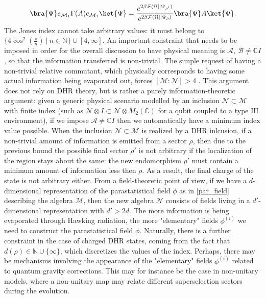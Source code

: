 \documentclass[a4paper,11pt]{article}
\begin{document}
\begin{equation}
    \bra{\Psi} e_{\mathcal{M}_1} \Gamma (A) e_{\mathcal{M}_1} \ket{\Psi} = \frac{e^{2 \beta \mathcal{F}(\Omega||\Psi_{\rho'}) }}{e^{2 \beta \mathcal{F}(\Omega||\Psi_{\rho})}} \bra{\Psi} A \ket{\Psi} \text{.}
\end{equation}
%
The Jones index cannot take arbitrary values: it must belong to $\{ 4 \cos^2(\frac{\pi}{n}) \ | \ n \in \mathbb{N} \} \cup [4, \infty]$. An important constraint that needs to be imposed in order for the overall discussion to have physical meaning is $\mathcal{A}, \ \mathcal{B} \neq \mathbb{C} I$, so that the information transferred is non-trivial. The simple request of having a non-trivial relative commutant, which physically corresponds to having some actual information being evaporated out, forces $[\mathcal{M} : \mathcal{N}] > 4$ \cite{Jones} \cite{Kosaki}. This argument does not rely on DHR theory, but is rather a purely information-theoretic argument: given a generic physical scenario modelled by an inclusion $\mathcal{N} \subset \mathcal{M}$ with finite index (such as $\mathcal{N} \otimes I \subset \mathcal{N} \otimes M_2(\mathbb{C})$ for a qubit coupled to a type $\mathrm{III}$ environment), if we impose $\mathcal{A} \neq \mathbb{C} I$ then we automatically have a minimum index value possible. When the inclusion $\mathcal{N} \subset \mathcal{M}$ is realized by a DHR inlcusion, if a non-trivial amount of information is emitted from a sector $\rho$, then due to the previous bound the possible final sector $\rho'$ is not arbitrary if the localization of the region stays about the same: the new endomorphism $\rho'$ must contain a minimum amount of information less then $\rho$. As a result, the final charge of the state is not arbitrary either.
From a field-theoretic point of view, if we have a $d$-dimensional representation of the parastatistical field $\phi$ as in \ref{par_field} describing the algebra $\mathcal{M}$, then the new algebra $\mathcal{N}$ consists of fields living in a $d'$-dimensional representation with $d' > 2d$. The more information is being evaporated through Hawking radiation, the more "elementary" fields $\phi^{(i)}$ we need to construct the parastatistical field $\phi$. Naturally, there is a further constraint in the case of charged DHR states, coming from the fact that $d(\rho) \in \mathbb{N} \cup \{ \infty \}$, which discretizes the values of the index. Perhaps, there may be mechanisms involving the appearance of the "elementary" fields $\phi^{(i)}$ related to quantum gravity corrections. This may for instance be the case in non-unitary models, where a non-unitary map may relate different superselection sectors during the evolution.
\end{document}
